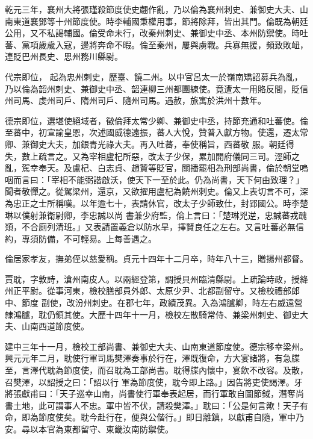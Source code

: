 \begin{pinyinscope}
 乾元三年，襄州大將張瑾殺節度使史翽作亂，乃以倫為襄州刺史、兼御史大夫、山南東道襄鄧等十州節度使。時李輔國秉權用事，節將除拜，皆出其門。倫既為朝廷公用，又不私謁輔國。倫受命未行，改秦州刺史、兼御史中丞、本州防禦使。時吐蕃、黨項歲歲入寇，邊將奔命不暇。倫至秦州，屢與虜戰。兵寡無援，頻致敗衄，連貶巴州長史、思州務川縣尉。



 代宗即位，
 起為忠州刺史，歷臺、饒二州。以中官呂太一於嶺南矯詔募兵為亂，乃以倫為韶州刺史、兼御史中丞、韶連柳三州都團練使。竟遭太一用賂反間，貶信州司馬、虔州司戶、隋州司戶、隨州司馬。遇赦，旅寓於洪州十數年。



 德宗即位，選堪使絕域者，徵倫拜太常少卿、兼御史中丞，持節充通和吐蕃使。倫至蕃中，初宣諭皇恩，次述國威德遠振，蕃人大悅，贊普入獻方物。使還，遷太常卿、兼御史大夫，加銀青光祿大夫。再入吐蕃，奉使稱旨，西蕃敬
 服。朝廷得失，數上疏言之。又為宰相盧杞所惡，改太子少保，累加開府儀同三司。涇師之亂，駕幸奉天。及盧杞、白志貞、趙贊等貶官，關播罷相為刑部尚書，倫於朝堂嗚咽而言曰：「宰相不能弼諧啟沃，使天下一至於此。仍為尚書，天下何由致理？」聞者敬憚之。從駕梁州，還京，又欲擢用盧杞為饒州刺史。倫又上表切言不可，深為忠正之士所稱嘆。以年逾七十，表請休官，改太子少師致仕，封郢國公。時李楚琳以僕射兼衛尉卿，李忠誠以尚
 書兼少府監，倫上言曰：「楚琳兇逆，忠誠蕃戎醜類，不合廁列清班。」又表請置義倉以防水旱，擇賢良任之左右。又言吐蕃必無信約，專須防備，不可輕易。上每善遇之。



 倫居家孝友，撫弟侄以慈愛稱。貞元十四年十二月卒，時年八十三，贈揚州都督。



 賈耽，字敦詩，滄州南皮人。以兩經登第，調授貝州臨清縣尉。上疏論時政，授絳州正平尉。從事河東，檢校膳部員外郎、太原少尹、北都副留守。又檢校禮部郎中、節度
 副使，改汾州刺史。在郡七年，政績茂異。入為鴻臚卿，時左右威遠營隸鴻臚，耽仍領其使。大歷十四年十一月，檢校左散騎常侍、兼梁州刺史、御史大夫、山南西道節度使。



 建中三年十一月，檢校工部尚書、兼御史大夫、山南東道節度使。德宗移幸梁州。興元元年二月，耽使行軍司馬樊澤奏事於行在，澤既復命，方大宴諸將，有急牒至，言澤代耽為節度使，而召耽為工部尚書。耽得牒內懷中，宴飲不改容。及散，召樊澤，以詔授之曰：「詔以行
 軍為節度使，耽今即上路。」因告將吏使謁澤。牙將張獻甫曰：「天子巡幸山南，尚書使行軍奉表起居，而行軍敢自圖節鉞，潛奪尚書土地，此可謂事人不忠。軍中皆不伏，請殺樊澤。」耽曰：「公是何言歟！天子有命，即為節度使矣。耽今赴行在，便與公偕行。」即日離鎮，以獻甫自隨，軍中乃安。尋以本官為東都留守、東畿汝南防禦使。




\end{pinyinscope}
